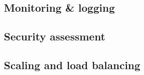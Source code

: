 \subsection{Monitoring \& logging}
\subsection{Security assessment}
\subsection{Scaling and load balancing}
